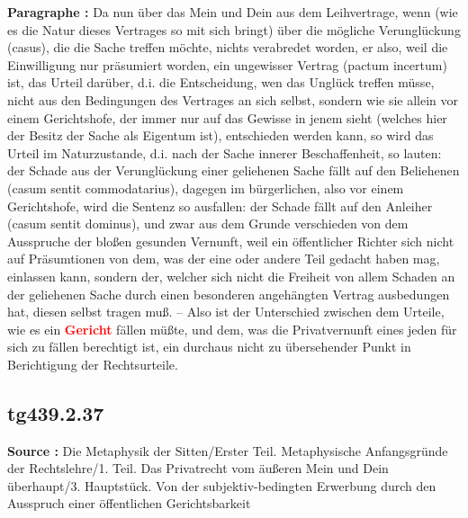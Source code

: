 \documentclass[a4paper,12pt,twoside]{book}
\newcommand{\match}[1]{\textcolor{red}{\textbf{#1}}}
\begin{document}
	\textbf{Paragraphe : }Da nun über das Mein und Dein aus dem Leihvertrage, wenn (wie es die Natur dieses Vertrages so mit sich bringt) über die mögliche Verunglückung (casus), die die Sache treffen möchte, nichts verabredet worden, er also, weil die  Einwilligung nur präsumiert worden, ein ungewisser Vertrag (pactum incertum) ist, das Urteil darüber, d.i. die Entscheidung, wen das Unglück treffen müsse, nicht aus den Bedingungen des Vertrages an sich selbst, sondern wie sie allein vor einem Gerichtshofe, der immer nur auf das Gewisse in jenem sieht (welches hier der Besitz der Sache als Eigentum ist), entschieden werden kann, so wird das Urteil im Naturzustande, d.i. nach der Sache innerer Beschaffenheit, so lauten: der Schade aus der Verunglückung einer geliehenen Sache fällt auf den Beliehenen (casum sentit commodatarius), dagegen im bürgerlichen, also vor einem Gerichtshofe, wird die Sentenz so ausfallen: der Schade fällt auf den Anleiher (casum sentit dominus), und zwar aus dem Grunde verschieden von dem Ausspruche der bloßen gesunden Vernunft, weil ein öffentlicher Richter sich nicht auf Präsumtionen von dem, was der eine oder andere Teil gedacht haben mag, einlassen kann, sondern der, welcher sich nicht die Freiheit von allem Schaden an der geliehenen Sache durch einen besonderen angehängten Vertrag ausbedungen hat, diesen selbst tragen muß. – Also ist der Unterschied zwischen dem Urteile, wie es ein \match{Gericht} fällen müßte, und dem, was die Privatvernunft eines jeden für sich zu fällen berechtigt ist, ein durchaus nicht zu übersehender Punkt in Berichtigung der Rechtsurteile. 
	
	\subsection*{tg439.2.37} 
	\textbf{Source : }Die Metaphysik der Sitten/Erster Teil. Metaphysische Anfangsgründe der Rechtslehre/1. Teil. Das Privatrecht vom äußeren Mein und Dein überhaupt/3. Hauptstück. Von der subjektiv-bedingten Erwerbung durch den Ausspruch einer öffentlichen Gerichtsbarkeit\\  
	
\end{document}
